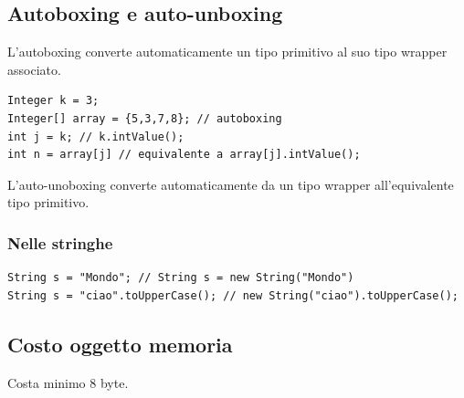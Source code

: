\documentclass[11pt]{article}
\begin{document}
\subsection{Autoboxing e auto-unboxing}
\label{sec:orgd8e1576}
L'autoboxing converte automaticamente un tipo primitivo al suo tipo wrapper associato.
\begin{verbatim}
Integer k = 3;
Integer[] array = {5,3,7,8}; // autoboxing
int j = k; // k.intValue();
int n = array[j] // equivalente a array[j].intValue();
\end{verbatim}
L'auto-unoboxing converte automaticamente da un tipo wrapper all'equivalente tipo primitivo.
\subsubsection{Nelle stringhe}
\label{sec:orgf7144d8}
\begin{verbatim}
String s = "Mondo"; // String s = new String("Mondo")
String s = "ciao".toUpperCase(); // new String("ciao").toUpperCase();
\end{verbatim}
\subsection{Costo oggetto memoria}
\label{sec:orgd4bb91a}
Costa minimo 8 byte.
\end{document}
